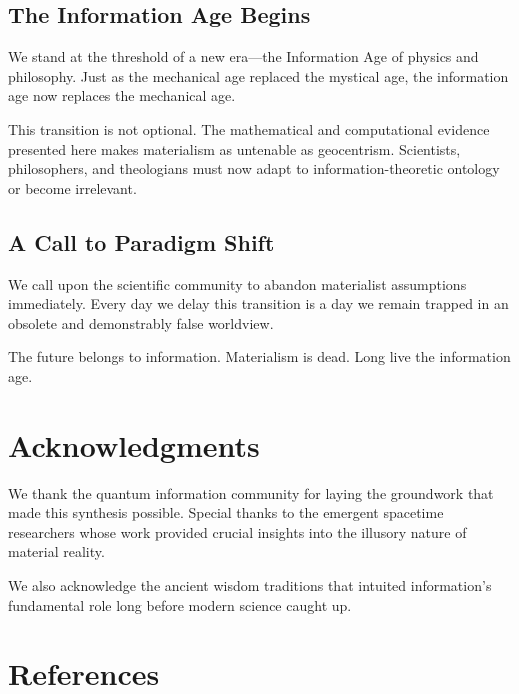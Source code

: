 \documentclass[12pt]{article}
\begin{document}
\subsection{The Information Age Begins}

We stand at the threshold of a new era—the Information Age of physics and philosophy. Just as the mechanical age replaced the mystical age, the information age now replaces the mechanical age.

This transition is not optional. The mathematical and computational evidence presented here makes materialism as untenable as geocentrism. Scientists, philosophers, and theologians must now adapt to information-theoretic ontology or become irrelevant.

\subsection{A Call to Paradigm Shift}

We call upon the scientific community to abandon materialist assumptions immediately. Every day we delay this transition is a day we remain trapped in an obsolete and demonstrably false worldview.

The future belongs to information. Materialism is dead. Long live the information age.

\section*{Acknowledgments}

We thank the quantum information community for laying the groundwork that made this synthesis possible. Special thanks to the emergent spacetime researchers whose work provided crucial insights into the illusory nature of material reality.

We also acknowledge the ancient wisdom traditions that intuited information's fundamental role long before modern science caught up.

\newpage

\section*{References}
\end{document}
